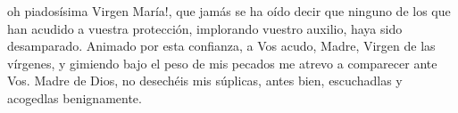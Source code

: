 oh piadosísima Virgen María!, que jamás se ha oído decir que ninguno de los que han acudido a vuestra protección, 
implorando vuestro auxilio, haya sido desamparado. Animado por esta confianza, a Vos acudo, Madre, Virgen de las vírgenes, y gimiendo 
bajo el peso de mis pecados me atrevo a comparecer ante Vos. Madre de Dios, no desechéis mis súplicas, antes bien, escuchadlas y 
acogedlas benignamente.